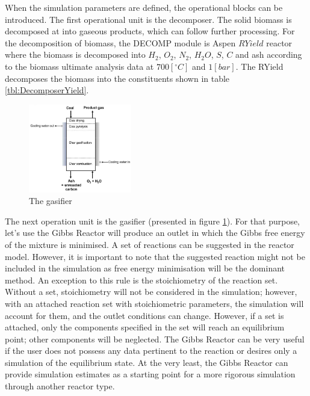 When the simulation parameters are defined, the operational blocks can be introduced. The first operational unit is the decomposer. The solid biomass is decomposed at into gaseous products, which can follow further processing. For the decomposition of biomass, the DECOMP module is Aspen $RYield$ reactor where the biomass is decomposed into $H_2$, $O_2$, $N_2$, $H_2O$, $S$, $C$ and ash according to the biomass ultimate analysis data at $700 [^\circ C]$ and $1 [bar]$. The RYield decomposes the biomass into the constituents shown in table \ref{tbl:DecomposerYield}.

\begin{table}[h!]
	\centering
	\caption{Yields for the RYIELD reactor}
	\label{tbl:DecomposerYield}
\end{table}

\begin{figure}
	\begin{center}
		\includegraphics[width=0.4\textwidth]{Figures/TchermochemicalProcesses/Gasifier.png}
	\end{center}
	\caption{The gasifier}
	\label{fig::Gasifier}
\end{figure}  

The next operation unit is the gasifier (presented in figure \ref{fig::Gasifier}). For that purpose, let's use the Gibbs Reactor will produce an outlet in which the Gibbs free energy of the mixture is minimised. A set of reactions can be suggested in the reactor model. However, it is important to note that the suggested reaction might not be included in the simulation as free energy minimisation will be the dominant method. An exception to this rule is the stoichiometry of the reaction set. Without a set, stoichiometry will not be considered in the simulation; however, with an attached reaction set with stoichiometric parameters, the simulation will account for them, and the outlet conditions can change. However, if a set is attached, only the components specified in the set will reach an equilibrium point; other components will be neglected. The Gibbs Reactor can be very useful if the user does not possess any data pertinent to the reaction or desires only a simulation of the equilibrium state. At the very least, the Gibbs Reactor can provide simulation estimates as a starting point for a more rigorous simulation through another reactor type.

